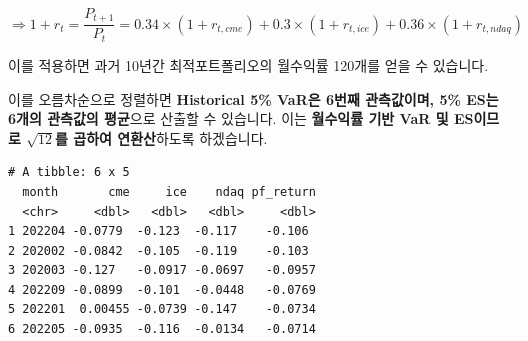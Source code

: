 \documentclass[
  a4paper,
  DIV=11,
  numbers=noendperiod]{scrreprt}
\newenvironment{Shaded}{\begin{snugshade}}{\end{snugshade}}
\newcommand{\AttributeTok}[1]{\textcolor[rgb]{0.40,0.45,0.13}{#1}}
\newcommand{\DecValTok}[1]{\textcolor[rgb]{0.68,0.00,0.00}{#1}}
\newcommand{\FunctionTok}[1]{\textcolor[rgb]{0.28,0.35,0.67}{#1}}
\newcommand{\NormalTok}[1]{\textcolor[rgb]{0.00,0.23,0.31}{#1}}
\newcommand{\OtherTok}[1]{\textcolor[rgb]{0.00,0.23,0.31}{#1}}
\newcommand{\SpecialCharTok}[1]{\textcolor[rgb]{0.37,0.37,0.37}{#1}}
\newcommand{\StringTok}[1]{\textcolor[rgb]{0.13,0.47,0.30}{#1}}
\begin{document}
\[\Rightarrow 1+r_t=\frac{P_{t+1}}{P_t}=0.34\times (1+r_{t,cme})+0.3\times (1+r_{t,ice})+0.36\times (1+r_{t,ndaq})\]

이를 적용하면 과거 10년간 최적포트폴리오의 월수익률 120개를 얻을 수
있습니다.

이를 오름차순으로 정렬하면 \textbf{Historical 5\% VaR은 6번째
관측값이며, 5\% ES는 6개의 관측값의 평균}으로 산출할 수 있습니다. 이는
\textbf{월수익률 기반 VaR 및 ES이므로 \(\sqrt{12}\)를 곱하여
연환산}하도록 하겠습니다.

\begin{Shaded}
\end{Shaded}

\begin{verbatim}
# A tibble: 6 x 5
  month       cme     ice    ndaq pf_return
  <chr>     <dbl>   <dbl>   <dbl>     <dbl>
1 202204 -0.0779  -0.123  -0.117    -0.106 
2 202002 -0.0842  -0.105  -0.119    -0.103 
3 202003 -0.127   -0.0917 -0.0697   -0.0957
4 202209 -0.0899  -0.101  -0.0448   -0.0769
5 202201  0.00455 -0.0739 -0.147    -0.0734
6 202205 -0.0935  -0.116  -0.0134   -0.0714
\end{verbatim}
\end{document}
